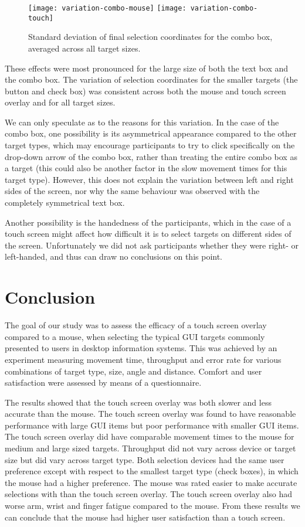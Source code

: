 \documentclass[reviewcopy]{elsart}
\begin{document}
\begin{figure}
	\centering
	\texttt{[image: variation-combo-mouse]}
	\texttt{[image: variation-combo-touch]}
	\caption{Standard deviation of final selection coordinates for the
	combo box, averaged across all target sizes.}
	\label{fig-variation-combobox}
\end{figure}


These effects were most pronounced for the large size of both the text
box and the combo box. The variation of selection coordinates for the
smaller targets (the button and check box) was consistent across both
the mouse and touch screen overlay and for all target sizes.

We can only speculate as to the reasons for this variation. In the case
of the combo box, one possibility is its asymmetrical appearance
compared to the other target types, which may encourage participants to
try to click specifically on the drop-down arrow of the combo box,
rather than treating the entire combo box as a target (this could also
be another factor in the slow movement times for this target type).
However, this does not explain the variation between left and right
sides of the screen, nor why the same behaviour was observed with the
completely symmetrical text box.

Another possibility is the handedness of the participants, which in the
case of a touch screen might affect how difficult it is to select
targets on different sides of the screen. Unfortunately we did not ask
participants whether they were right- or left-handed, and thus can draw
no conclusions on this point.


\section{Conclusion}
\label{sec-conclusions}

The goal of our study was to assess the efficacy of a touch screen
overlay compared to a mouse, when selecting the typical GUI targets
commonly presented to users in desktop information systems. This was
achieved by an experiment measuring movement time, throughput and error
rate for various combinations of target type, size, angle and distance.
Comfort and user satisfaction were assessed by means of a questionnaire.

The results showed that the touch screen overlay was both slower and
less accurate than the mouse. The touch screen overlay was found to have
reasonable performance with large GUI items but poor performance with
smaller GUI items. The touch screen overlay did have comparable movement
times to the mouse for medium and large sized targets. Throughput did
not vary across device or target size but did vary across target type.
Both selection devices had the same user preference except with respect
to the smallest target type (check boxes), in which the mouse had a
higher preference. The mouse was rated easier to make accurate
selections with than the touch screen overlay. The touch screen overlay
also had worse arm, wrist and finger fatigue compared to the mouse. From
these results we can conclude that the mouse had higher user
satisfaction than a touch screen.
\end{document}
